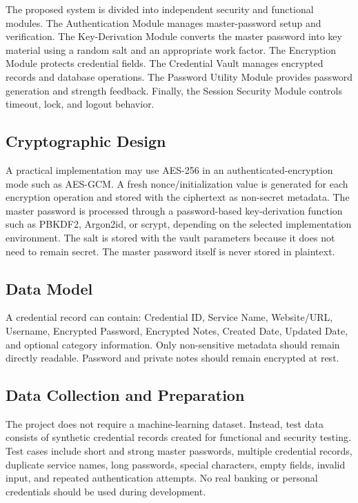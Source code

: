 \documentclass[12pt,a4paper,oneside]{report}
\begin{document}
The proposed system is divided into independent security and functional modules. The Authentication Module manages master-password setup and verification. The Key-Derivation Module converts the master password into key material using a random salt and an appropriate work factor. The Encryption Module protects credential fields. The Credential Vault manages encrypted records and database operations. The Password Utility Module provides password generation and strength feedback. Finally, the Session Security Module controls timeout, lock, and logout behavior.

\subsection{Cryptographic Design}

A practical implementation may use AES-256 in an authenticated-encryption mode such as AES-GCM. A fresh nonce/initialization value is generated for each encryption operation and stored with the ciphertext as non-secret metadata. The master password is processed through a password-based key-derivation function such as PBKDF2, Argon2id, or scrypt, depending on the selected implementation environment. The salt is stored with the vault parameters because it does not need to remain secret. The master password itself is never stored in plaintext.

\subsection{Data Model}

A credential record can contain: Credential ID, Service Name, Website/URL, Username, Encrypted Password, Encrypted Notes, Created Date, Updated Date, and optional category information. Only non-sensitive metadata should remain directly readable. Password and private notes should remain encrypted at rest.

\subsection{Data Collection and Preparation}

The project does not require a machine-learning dataset. Instead, test data consists of synthetic credential records created for functional and security testing. Test cases include short and strong master passwords, multiple credential records, duplicate service names, long passwords, special characters, empty fields, invalid input, and repeated authentication attempts. No real banking or personal credentials should be used during development.
\end{document}
